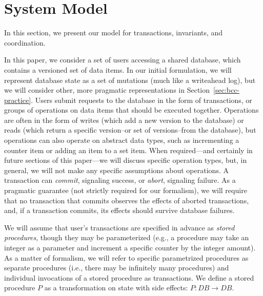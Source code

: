 
\section{System Model}
\label{sec:model}

In this section, we present our model for transactions, invariants,
and coordination.

 In this paper, we
consider a set of users accessing a shared database, which contains a
versioned set of data items. In our initial formulation, we will
represent database state as a set of mutations (much like a writeahead
log), but we will consider other, more pragmatic representations in
Section~\ref{sec:bcc-practice}. Users submit requests to the database in
the form of transactions, or groups of operations on data items that
should be executed together. Operations are often in the form of
writes (which add a new version to the database) or reads (which
return a specific version--or set of versions--from the database), but
operations can also operate on abstract data types, such as
incrementing a counter item or adding an item to a set item. When
required---and certainly in future sections of this paper---we will
discuss specific operation types, but, in general, we will not make
any specific assumptions about operations. A transaction can
\textit{commit}, signaling success, or \textit{abort}, signaling
failure. As a pragmatic guarantee (not strictly required for our
formalism), we will require that no transaction that commits observes
the effects of aborted transactions, and, if a transaction commits,
its effects should survive database failures. 

We will assume that user's transactions are specified in advance as
\textit{stored procedures}, though they may be parameterized (e.g., a
procedure may take an integer as a parameter and increment a specific
counter by the integer amount). As a matter of formalism, we will
refer to specific parametrized procedures as separate procedures
(i.e., there may be infinitely many procedures) and individual
invocations of a stored procedure as transactions.  We define a stored
procedure $P$ as a transformation on state with side effects: $P: DB
\rightarrow DB$.

